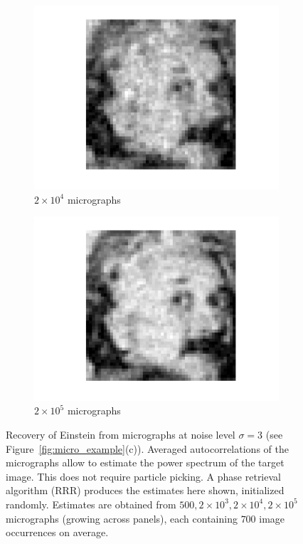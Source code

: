 \documentclass[9pt,twocolumn,twoside,lineno]{pnas-new}
\begin{document}
\begin{figure}[h]
\begin{subfigure}[h]{0.24\textwidth}
		\includegraphics[scale=0.35]{Einstien_progress_40}
		\caption{$2\times 10^4$ micrographs}
	\end{subfigure} 
	\begin{subfigure}[h]{0.24\textwidth}
		\centering
		\includegraphics[scale=0.35]{Einstien_progress_400}
		\caption{$2\times 10^5$ micrographs}
	\end{subfigure}
	\caption{\label{fig:Einst_example} Recovery of Einstein from micrographs at noise level $\sigma = 3$ (see Figure~\ref{fig:micro_example}(c)). Averaged autocorrelations of the micrographs allow to estimate the power spectrum of the target image. This does not require particle picking. A phase retrieval algorithm (RRR) produces the estimates here shown, initialized randomly. Estimates are obtained from $500,2\times 10^3,2\times 10^4,2\times 10^5$ micrographs (growing across panels), each containing $700$ image occurrences on average.}	
\end{figure}
\end{document}
